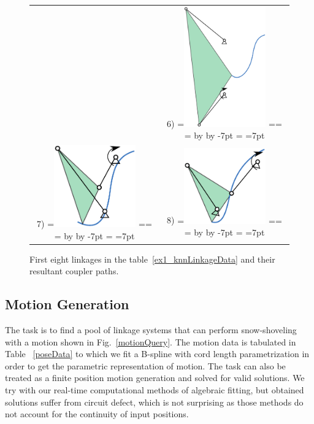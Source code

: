 \documentclass[twocolumn,10pt]{asme2ej}
\makeatletter
\newcommand{\putindeepbox}[2][0.7\baselineskip]{{%
    \setbox0=\hbox{#2}%
    \setbox0=\vbox{\noindent\hsize=\wd0\unhbox0}
    \@tempdima=\dp0
    \advance\@tempdima by \ht0
    \advance\@tempdima by -#1\relax
    \dp0=\@tempdima
    \ht0=#1\relax
    \box0
}}
\makeatother
\begin{document}
\begin{figure}
\begin{tabular}{cc}
    & 6)\putindeepbox[7pt]{\includegraphics[width=100pt]{figure/path_solutions/path_sol6.eps}} \\
  7)\putindeepbox[7pt]{\includegraphics[width=100pt]{figure/path_solutions/path_sol7.eps}}
    & 8)\putindeepbox[7pt]{\includegraphics[width=100pt]{figure/path_solutions/path_sol8.eps}}\\
\end{tabular}
\caption{First eight linkages in the table~\ref{ex1_knnLinkageData} and their resultant coupler paths.}
\label{ex1_solns}
\end{figure}

\subsection{Motion Generation}
The task is to find a pool of linkage systems that can perform snow-shoveling with a motion shown in Fig.~\ref{motionQuery}.
The motion data is tabulated in Table ~\ref{poseData} to which we fit a B-spline with cord length parametrization in order to get the parametric representation of motion.
The task can also be treated as a finite position motion generation and solved for valid solutions.
We try with our real-time computational methods of algebraic fitting\cite{generalfitting-JCISE},\cite{shrinathpurwar2017} but obtained solutions suffer from circuit defect, which is not surprising as those methods do not account for the continuity of input positions.
\end{document}
